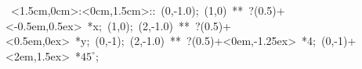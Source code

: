 \hbox{
\xy    <1.5cm,0cm>:<0cm,1.5cm>::
       (0,-1.0); (1,0) **\dir{-}  ?(0.5)+<-0.5em,0.5ex> *{x};
       (1,0); (2,-1.0) **\dir{-}  ?(0.5)+<0.5em,0ex> *{y};
       (0,-1); (2,-1.0) **\dir{-}    ?(0.5)+<0em,-1.25ex> *{4};
	   (0,-1)+<2em,1.5ex> *{\hbox{$45^{\circ}$}};
       \endxy}
